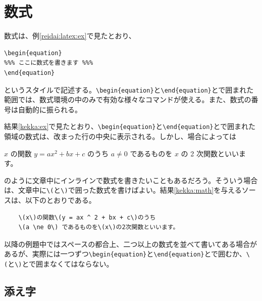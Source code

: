 \section{数式}
\label{sec:latex:math}

数式は、例\ref{reidai:latex:ex}で見たとおり、
\begin{reidai}
    \begin{verbatim}
\begin{equation}
%%% ここに数式を書きます %%%
\end{equation}
\end{verbatim}
\end{reidai} \noindent
というスタイルで記述する。\verb|\begin{equation}|と\verb|\end{equation}|とで囲まれた範囲では、数式環境の中のみで有効な様々なコマンドが使える。また、数式の番号は自動的に振られる。

結果\ref{kekka:ex}で見たとおり、\verb|\begin{equation}|と\verb|\end{equation}|とで囲まれた領域の数式は、改まった行の中央に表示される。しかし、場合によっては
\addtocounter{reidai}{1}
\begin{kekka}
    \label{kekka:math}
    \(x\) の関数 \(y = ax ^ 2 + bx + c\) のうち
    \(a \ne 0\) であるものを \(x\) の 2 次関数といいます。
\end{kekka} \noindent
のように文章中にインラインで数式を書きたいこともあるだろう。そういう場合は、文章中に\texttt{\textbackslash(}と\texttt{\textbackslash)}で囲った数式を書けばよい。結果\ref{kekka:math}を与えるソースは、以下のとおりである。\addtocounter{reidai}{-1}
\begin{reidai}
    \begin{verbatim}
    \(x\)の関数\(y = ax ^ 2 + bx + c\)のうち
    \(a \ne 0\) であるものを\(x\)の2次関数といいます。
\end{verbatim}
\end{reidai} \noindent
以降の例題中ではスペースの都合上、二つ以上の数式を並べて書いてある場合があるが、実際には一つずつ\verb|\begin{equation}|と\verb|\end{equation}|とで囲むか、\texttt{\textbackslash(}と\texttt{\textbackslash)}とで囲まなくてはならない。

\subsection{添え字}
\label{sec:latex:index}

